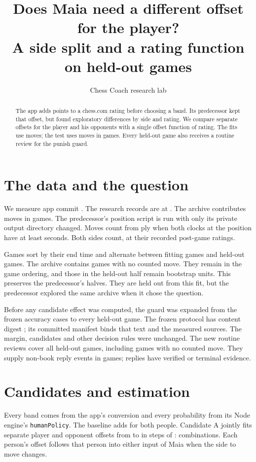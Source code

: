 \documentclass{article}
\title{Does Maia need a different offset for the player?\\
\large A side split and a rating function on held-out games}
\author{Chess Coach research lab}
\date{}
\begin{document}
\maketitle

\begin{abstract}
The app adds \Base{} points to a chess.com rating before choosing a
\ModelName{} band. Its predecessor kept that offset, but found exploratory
differences by side and rating. We compare separate offsets for the player
and his opponents with a single offset function of rating. The fits use
\FitMoves{} moves; the test uses \HeldMoves{} moves in \HeldGames{} games.
Every held-out game also receives a routine review for the punish guard.
\Verdict{}
\end{abstract}

\section{The data and the question}
We measure app commit \AppCommit. The research records are at
\RecordsCommit. The archive contributes \Moves{} moves in \Games{} games.
The predecessor's position script is run with only its private output
directory changed. Moves count from ply \MinPly{} when both clocks at the
position have at least \MinClock{} seconds. Both sides count, at their
recorded post-game ratings.

Games sort by their end time and alternate between \FitGames{} fitting
games and \HeldGames{} held-out games. The archive contains \EmptyGames{}
games with no counted move. They remain in the game ordering, and those in
the held-out half remain bootstrap units. This preserves the predecessor's
halves. They are held out from this fit, but the predecessor explored the
same archive when it chose the question.

Before any candidate effect was computed, the guard was expanded from the
frozen accuracy cases to every held-out game. The frozen protocol has
content digest \ProtocolDigest; its committed manifest binds that text
and the measured sources. The margin, candidates and other decision rules
were unchanged. The new routine reviews cover all \GuardGames{} held-out games,
including games with no counted move. They supply \PunishEvents{} non-book
reply events in \PunishGames{} games; \PunishVerified{} replies have
verified or terminal evidence.

\section{Candidates and estimation}
Every band comes from the app's conversion and every probability from its
Node engine's \texttt{humanPolicy}. The baseline adds \Base{} for both
people. Candidate A jointly fits separate player and opponent offsets from
\OffsetMin{} to \OffsetMax{} in steps of \OffsetStep{}: \ACount{}
combinations. Each person's offset follows that person into either input
of Maia when the side to move changes.
\end{document}
